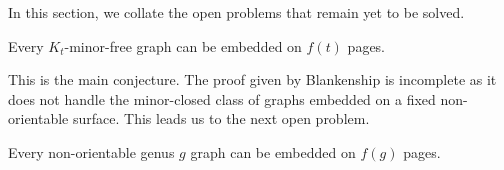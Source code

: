 In this section, we collate the open problems that remain yet to be solved.

\begin{conjecture}
    Every $K_t$-minor-free graph can be embedded on $f(t)$ pages.
\end{conjecture}

This is the main conjecture. The proof given by Blankenship is incomplete as it does not handle the minor-closed class of graphs embedded on a fixed non-orientable surface. This leads us to the next open problem.

\begin{conjecture}
    Every non-orientable genus $g$ graph can be embedded on $f(g)$ pages.
\end{conjecture}

